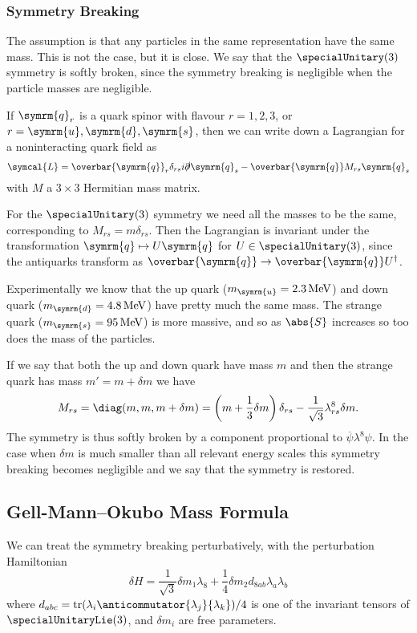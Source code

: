 \documentclass[fleqn]{NotesClass}
\newcommand{\Pparticle}[1]{\symrm{#1}}
\newcommand{\Pu}{\ensuremath{\Pparticle{u}}}
\newcommand{\Pd}{\ensuremath{\Pparticle{d}}}
\newcommand{\Ps}{\ensuremath{\Pparticle{s}}}
\newcommand{\Pq}{\ensuremath{\Pparticle{q}}}
\newcommand{\hermit}{\dagger}
\DeclareMathOperator{\tr}{tr}
\newcommand{\diracadjoint}[1]{\overbar{#1}}
\newcommand{\lagrangianDensity}{\symcal{L}}
\begin{document}
    \subsubsection{Symmetry Breaking}
    The assumption is that any particles in the same representation have the same mass.
    This is not the case, but it is close.
    We say that the \(\specialUnitary(3)\) symmetry is softly broken, since the symmetry breaking is negligible when the particle masses are negligible.
    
    If \(\Pq_r\) is a quark spinor with flavour \(r = 1, 2, 3\), or \(r = \Pu, \Pd, \Ps\), then we can write down a Lagrangian for a noninteracting quark field as
    \begin{equation}
        \lagrangianDensity = \diracadjoint{\Pq}_r \delta_{rs} i\slashed{\partial} \Pq_s - \diracadjoint{\Pq} M_{rs} \Pq_s
    \end{equation}
    with \(M\) a \(3 \times 3\) Hermitian mass matrix.
    
    For the \(\specialUnitary(3)\) symmetry we need all the masses to be the same, corresponding to \(M_{rs} = m \delta_{rs}\).
    Then the Lagrangian is invariant under the transformation \(\Pq \mapsto U \Pq\) for \(U \in \specialUnitary(3)\), since the antiquarks transform as \(\diracadjoint{\Pq} \to \diracadjoint{\Pq}U^{\hermit}\).
    
    Experimentally we know that the up quark (\(m_{\Pu} = \qty{2.3}{\mega\electronvolt}\)) and down quark (\(m_{\Pd} = \qty{4.8}{\mega\electronvolt}\)) have pretty much the same mass.
    The strange quark (\(m_{\Ps} = \qty{95}{\mega\electronvolt}\)) is more massive, and so as \(\abs{S}\) increases so too does the mass of the particles.
    
    If we say that both the up and down quark have mass \(m\) and then the strange quark has mass \(m' = m + \delta m\) we have
    \begin{equation}
        M_{rs} = \diag(m, m, m + \delta m) = \left( m + \frac{1}{3}\delta m \right) \delta_{rs} - \frac{1}{\sqrt{3}}\lambda_{rs}^8 \delta m.
    \end{equation}
    The symmetry is thus softly broken by a component proportional to \(\diracadjoint{\psi} \lambda^8 \psi\).
    In the case when \(\delta m\) is much smaller than all relevant energy scales this symmetry breaking becomes negligible and we say that the symmetry is restored.
    
    \subsection{Gell-Mann--Okubo Mass Formula}
    We can treat the symmetry breaking perturbatively, with the perturbation Hamiltonian
    \begin{equation}
        \delta H = \frac{1}{\sqrt{3}} \delta m_1 \lambda_8 + \frac{1}{4} \delta m_2 d_{8ab} \lambda_a \lambda_b
    \end{equation}
    where \(d_{abc} = \tr(\lambda_i \anticommutator{\lambda_j}{\lambda_k})/4\) is one of the invariant tensors of \(\specialUnitaryLie(3)\), and \(\delta m_i\) are free parameters.
    
\end{document}
